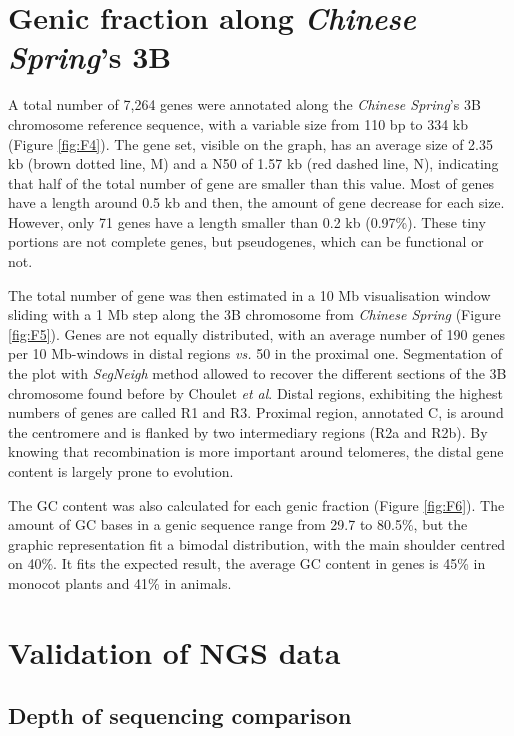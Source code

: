 \documentclass[a4paper, 12pt]{article}
\begin{document}
\begin{onehalfspace}
    \section{Genic fraction along \textit{Chinese Spring}'s 3B}

A total number of 7,264 genes were annotated along the \textit{Chinese Spring}'s 3B chromosome reference sequence, with a variable size from 110 bp to 334 kb (Figure \ref{fig:F4}). The gene set, visible on the graph, has an average size of 2.35 kb (brown dotted line, M) and a N50 of 1.57 kb (red dashed line, N), indicating that half of the total number of gene are smaller than this value. Most of genes have a length around 0.5 kb and then, the amount of gene decrease for each size. However, only 71 genes have a length smaller than 0.2 kb (0.97\%). These tiny portions are not complete genes, but pseudogenes, which can be functional or not.

The total number of gene was then estimated in a 10 Mb visualisation window sliding with a 1 Mb step along the 3B chromosome from \textit{Chinese Spring} (Figure \ref{fig:F5}). Genes are not equally distributed, with an average number of 190 genes per 10 Mb-windows in distal regions \textit{vs.} 50 in the proximal one. Segmentation of the plot with \textit{SegNeigh} method allowed to recover the different sections of the 3B chromosome found before by Choulet \textit{et al}. Distal regions, exhibiting the highest numbers of genes are called R1 and R3. Proximal region, annotated C, is around the centromere and is flanked by two intermediary regions (R2a and R2b). By knowing that recombination is more important around telomeres, the distal gene content is largely prone to evolution.

The GC content was also calculated for each genic fraction (Figure \ref{fig:F6}). The amount of GC bases in a genic sequence range from 29.7 to 80.5\%, but the graphic representation fit a bimodal distribution, with the main shoulder centred on 40\%. It fits the expected result, the average GC content in genes is 45\% in monocot plants and 41\% in animals.

    \section{Validation of NGS data}

        \subsection{Depth of sequencing comparison}
        

\end{onehalfspace}
\end{document}
